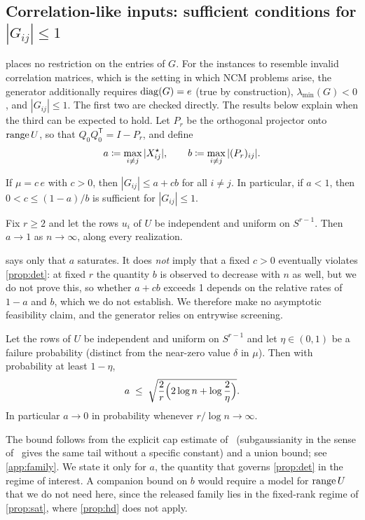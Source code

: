 \subsection{Correlation-like inputs: sufficient conditions for $|G_{ij}|\le1$}\label{sec:feasibility}
 places no restriction on the entries of $G$. For the
instances to resemble invalid correlation matrices, which is the setting in
which NCM problems arise, the generator additionally requires
$\operatorname{diag}(G)=e$ (true by construction), $\lambda_{\min}(G)<0$, and
$|G_{ij}|\le1$. The first two are checked directly. The results below explain
when the third can be expected to hold. Let $P_r$ be the orthogonal projector
onto $\operatorname{range} U$, so that $Q_0Q_0^{\mathsf T}=I-P_r$, and define
\[
  a \coloneqq \max_{i\ne j}|X^\star_{ij}|,\qquad b\coloneqq \max_{i\ne j}|(P_r)_{ij}|.
\]

\begin{proposition}\label{prop:det}
If $\mu=c\,e$ with $c>0$, then $|G_{ij}|\le a+cb$ for all $i\neq j$. In
particular, if $a<1$, then $0<c\le(1-a)/b$ is sufficient for $|G_{ij}|\le1$.
\end{proposition}

\begin{proposition}\label{prop:sat}
Fix $r\ge2$ and let the rows $u_i$ of $U$ be independent and uniform on
$S^{r-1}$. Then $a\to1$ as $n\to\infty$, along every realization.
\end{proposition}

 says only that $a$ saturates. It does \emph{not} imply that a
fixed $c>0$ eventually violates \cref{prop:det}: at fixed $r$ the quantity $b$
is observed to decrease with $n$ as well, but we do not prove
this, so whether $a+cb$ exceeds 1 depends on the relative
rates of $1-a$ and $b$, which we do not establish. We therefore make no
asymptotic feasibility claim, and the generator relies on entrywise
screening.

\begin{proposition}\label{prop:hd}
Let the rows of $U$ be independent and uniform on $S^{r-1}$ and let
$\eta\in(0,1)$ be a failure probability (distinct from the near-zero value
$\delta$ in $\mu$). Then with probability at least
$1-\eta$,
\[
  a\;\le\;\sqrt{\frac{2}{r}\Bigl(2\log n+\log\frac{2}{\eta}\Bigr)} .
\]
In particular $a\to0$ in probability whenever $r/\log n\to\infty$.
\end{proposition}

The bound follows from the explicit cap estimate
of~\cite[Lem.~2.2]{ball1997elementary} (subgaussianity in the sense
of~\cite[Thm.~3.4.5]{vershynin2026high} gives the same tail without a
specific constant) and a union bound; see
\cref{app:family}. We state it only for $a$, the quantity that governs
\cref{prop:det} in the regime of interest. A companion bound on $b$ would
require a model for $\operatorname{range} U$ that we do not need here, since the released
family lies in the fixed-rank regime of \cref{prop:sat}, where
\cref{prop:hd} does not apply.

